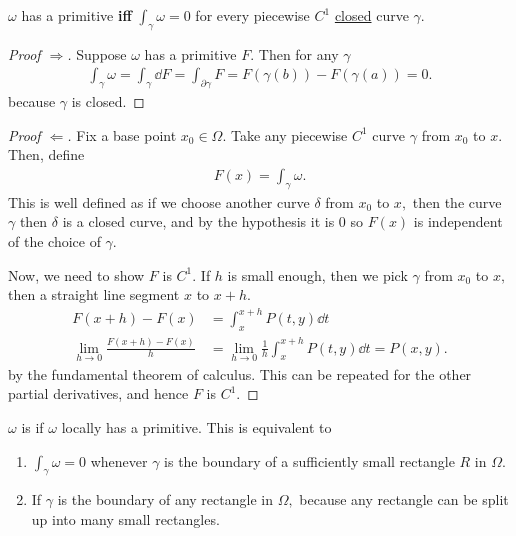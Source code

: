 \documentclass[a4paper,12pt]{article}
\begin{document}
\begin{proposition}
    $\omega$ has a primitive \textbf{iff} $\int_\gamma\omega=0$ for every piecewise $C^1$ \underline{closed} curve $\gamma.$
    \begin{proof}[Proof $\Rightarrow$]
        Suppose $\omega$ has a primitive $F.$ Then for any $\gamma$ \begin{align}
            \int_\gamma\omega=\int_\gamma\dd F=\int_{\partial\gamma}F=F(\gamma(b))-F(\gamma(a))=0.
        \end{align} because $\gamma$ is closed.
    \end{proof}
    \begin{proof}[Proof $\Leftarrow$]
        Fix a base point $x_0\in\Omega.$ Take any piecewise $C^1$ curve $\gamma$ from $x_0$ to $x.$ Then, define \begin{align}
            F(x)=\int_\gamma\omega.
        \end{align}
        This is well defined as if we choose another curve $\delta$ from $x_0$ to $x,$ then the curve $\gamma$ then $\delta$ is a closed curve, and by the hypothesis it is $0$ so $F(x)$ is independent of the choice of $\gamma.$

        Now, we need to show $F$ is $C^1.$ If $h$ is small enough, then we pick $\gamma$ from $x_0$ to $x,$ then a straight line segment $x$ to $x+h.$ \begin{align}
            F(x+h)-F(x)&=\int_{x}^{x+h}P(t,y)\dd t\\
            \lim_{h\to0}\frac{F(x+h)-F(x)}{h}&=\lim_{h\to0}\frac{1}{h}\int_{x}^{x+h}P(t,y)\dd t=P(x,y).
        \end{align}
        by the fundamental theorem of calculus. This can be repeated for the other partial derivatives, and hence $F$ is $C^1.$
    \end{proof}
\end{proposition}
\begin{definition}
    $\omega$ is  if $\omega$ locally has a primitive. This is equivalent to \begin{enumerate}
        \item $\int_\gamma\omega=0$ whenever $\gamma$ is the boundary of a sufficiently small rectangle $R$ in $\Omega.$
        \item If $\gamma$ is the boundary of any rectangle in $\Omega,$ because any rectangle can be split up into many small rectangles.
    \end{enumerate}
\end{definition}
\end{document}
